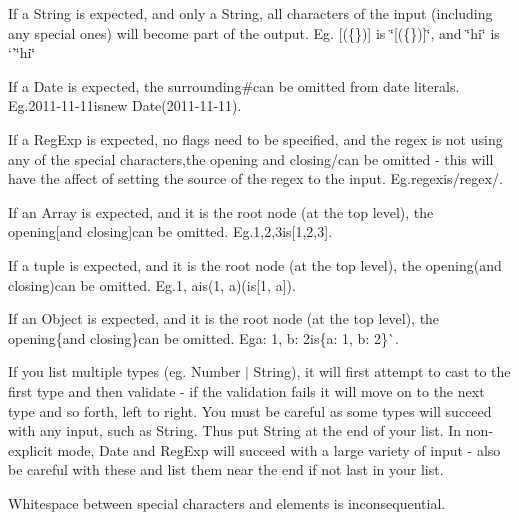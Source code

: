\begin{DoxyItemize}
\item If a String is expected, and only a String, all characters of the input (including any special ones) will become part of the output. Eg. {\ttfamily \mbox{[}(\{\})\mbox{]}} is {\ttfamily \char`\"{}\mbox{[}(\{\})\mbox{]}\char`\"{}}, and {\ttfamily \char`\"{}hi\char`\"{}} is `'\char`\"{}hi\char`\"{}
\item {\ttfamily If a Date is expected, the surrounding}\#{\ttfamily can be omitted from date literals. Eg.}2011-\/11-\/11{\ttfamily is}new Date(\textquotesingle{}2011-\/11-\/11\textquotesingle{}){\ttfamily .}
\item {\ttfamily If a Reg\+Exp is expected, no flags need to be specified, and the regex is not using any of the special characters,the opening and closing}/{\ttfamily can be omitted -\/ this will have the affect of setting the source of the regex to the input. Eg.}regex{\ttfamily is}/regex/{\ttfamily .}
\item {\ttfamily If an Array is expected, and it is the root node (at the top level), the opening}\mbox{[}{\ttfamily and closing}\mbox{]}{\ttfamily can be omitted. Eg.}1,2,3{\ttfamily is}\mbox{[}1,2,3\mbox{]}{\ttfamily .}
\item {\ttfamily If a tuple is expected, and it is the root node (at the top level), the opening}({\ttfamily and closing}){\ttfamily can be omitted. Eg.}1, a{\ttfamily is}(1, a){\ttfamily (is}\mbox{[}1, \textquotesingle{}a\textquotesingle{}\mbox{]}{\ttfamily ).}
\item {\ttfamily If an Object is expected, and it is the root node (at the top level), the opening}\{{\ttfamily and closing}\}{\ttfamily can be omitted. Eg}a\+: 1, b\+: 2{\ttfamily is}\{a\+: 1, b\+: 2\}\`{}.
\end{DoxyItemize}

If you list multiple types (eg. {\ttfamily Number $\vert$ String}), it will first attempt to cast to the first type and then validate -\/ if the validation fails it will move on to the next type and so forth, left to right. You must be careful as some types will succeed with any input, such as String. Thus put String at the end of your list. In non-\/explicit mode, Date and Reg\+Exp will succeed with a large variety of input -\/ also be careful with these and list them near the end if not last in your list.

Whitespace between special characters and elements is inconsequential.

